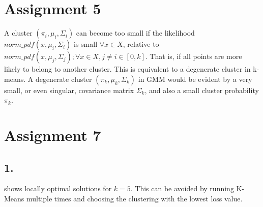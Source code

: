\documentclass[a4paper,11pt]{article}
\begin{document}
\section*{Assignment 5}
A cluster $(\pi_i, \mu_i, \Sigma_i)$ can become too small if the likelihood $norm\_pdf(x, \mu_i, \Sigma_i)$ is small $\forall x \in X$, relative to $norm\_pdf(x, \mu_j, \Sigma_j); \forall x \in X, j\neq i \in [0, k]$. That is, if all points are more likely to belong to another cluster.
This is equivalent to a degenerate cluster in k-means. A degenerate cluster $(\pi_k, \mu_k, \Sigma_k)$ in GMM would be evident by a very small, or even singular, covariance matrix $\Sigma_k$, and also a small cluster probability $\pi_k$.


\section*{Assignment 7}

\subsection*{1.}

 shows locally optimal solutions for $k=5$. This can be avoided by running K-Means multiple times and choosing the clustering with the lowest loss value.
\end{document}
